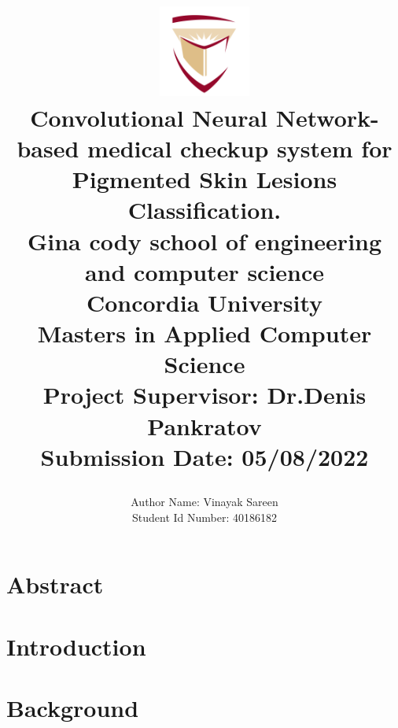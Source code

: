 \documentclass[]{report}
\title{
	\begin{center}
	\includegraphics[width=3cm]{assets/concordia-logo.png} \\
	\vspace{2mm}
	{Convolutional Neural Network-based medical checkup system for Pigmented Skin Lesions Classification.} \\
	\vspace{5mm} %
	\large {
		{Gina cody school of engineering and computer science}\\
		{Concordia University}\\
	}
	\vspace{3mm} %
	\textbf{ Masters in Applied Computer Science}\\
	{\large Project Supervisor: Dr.Denis Pankratov}\\
	{\large Submission Date: 05/08/2022} \\
	\end{center}
}
\author{
	{\large Author Name:  Vinayak Sareen} \\
	{\large Student Id Number:  40186182} \\
}
\date{}
\begin{document}
\maketitle

\chapter*{Abstract}



\tableofcontents

\chapter{Introduction}


\chapter{Background}

\end{document}
